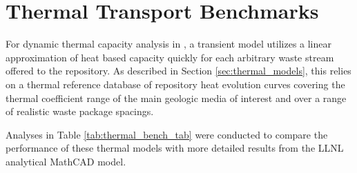 \section{Thermal Transport Benchmarks} \label{sec:thermal_benchmarking}



For dynamic thermal capacity analysis in \Cyder, a transient model utilizes a 
linear approximation of heat based capacity quickly for each arbitrary waste 
stream offered to the repository. As described in Section 
\ref{sec:thermal_models}, this relies on a thermal reference database 
of repository heat evolution curves covering the thermal coefficient range of 
the main geologic media of interest and over a range of realistic waste package 
spacings. 

Analyses in Table \ref{tab:thermal_bench_tab} were conducted to compare the 
performance of these thermal models with more detailed results from the 
\gls{LLNL} analytical MathCAD model.

